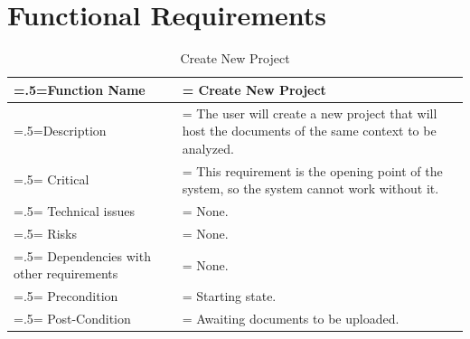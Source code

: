 \section{Functional Requirements}
\begin{center}
    \begin{table}[H]
        \caption{Create New Project}
        \begin{tabularx}{\textwidth} {
                | >{\raggedright\arraybackslash\hsize=.5\hsize\linewidth=\hsize}X
                | >{\raggedright\arraybackslash\hsize=1.5\hsize\linewidth=\hsize}X |}
            \hline
            Function Name                        & Create New Project                                                                                  \\ \hline
            Description                          & The user will create a new project that will host the documents of the same context to be analyzed. \\ \hline
            Critical                             & This requirement is the opening point of the system, so the system cannot work without it.          \\ \hline
            Technical issues                     & None.                                                                                               \\ \hline
            Risks                                & None.                                                                                               \\ \hline
            Dependencies with other requirements & None.                                                                                               \\ \hline
            Precondition                         & Starting state.                                                                                     \\ \hline
            Post-Condition                       & Awaiting documents to be uploaded.                                                                  \\ \hline
        \end{tabularx}
    \end{table}
\end{center}

